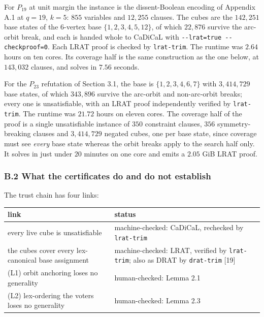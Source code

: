 \documentclass[
]{article}
\newcounter{none} %
\begin{document}
For \(P_{19}\) at unit margin the instance is the dissent-Boolean
encoding of Appendix A.1 at \(q = 19\), \(k = 5\): \(855\) variables and
\(12{,}255\) clauses. The cubes are the \(142{,}251\) base states of the
\(6\)-vertex base \(\{1,2,3,4,5,12\}\), of which \(22{,}876\) survive
the arc-orbit break, and each is handed whole to CaDiCaL with
\texttt{-\/-lrat=true\ -\/-checkproof=0}. Each LRAT proof is checked by
\texttt{lrat-trim}. The runtime was \(2.64\) hours on ten cores. Its
coverage half is the same construction as the one below, at
\(143{,}032\) clauses, and solves in \(7.56\) seconds.

For the \(P_{23}\) refutation of Section 3.1, the base is
\(\{1,2,3,4,6,7\}\) with \(3{,}414{,}729\) base states, of which
\(343{,}896\) survive the arc-orbit and non-arc-orbit breaks; every one
is unsatisfiable, with an LRAT proof independently verified by
\texttt{lrat-trim}. The runtime was \(21.72\) hours on eleven cores. The
coverage half of the proof is a single unsatisfiable instance of \(350\)
constraint clauses, \(356\) symmetry-breaking clauses and
\(3{,}414{,}729\) negated cubes, one per base state, since coverage must
see \emph{every} base state whereas the orbit breaks apply to the search
half only. It solves in just under \(20\) minutes on one core and emits
a \(2.05\) GiB LRAT proof.

\subsubsection{B.2 What the certificates do and do not
establish}\label{b.2-what-the-certificates-do-and-do-not-establish}

The trust chain has four links:

{\def\LTcaptype{none} %
\begin{longtable}[]{@{}
  >{\raggedright\arraybackslash}p{}
  >{\raggedright\arraybackslash}p{}@{}}
\toprule\noalign{}
\begin{minipage}[b]{\linewidth}\raggedright
link
\end{minipage} & \begin{minipage}[b]{\linewidth}\raggedright
status
\end{minipage} \\
\midrule\noalign{}
\endhead
\bottomrule\noalign{}
\endlastfoot
every live cube is unsatisfiable & machine-checked: CaDiCaL, rechecked
by \texttt{lrat-trim} \\
the cubes cover every lex-canonical base assignment & machine-checked:
LRAT, verified by \texttt{lrat-trim}; also as DRAT by \texttt{drat-trim}
{[}19{]} \\
(L1) orbit anchoring loses no generality & human-checked: Lemma 2.1 \\
(L2) lex-ordering the voters loses no generality & human-checked: Lemma
2.3 \\
\end{longtable}
}
\end{document}
